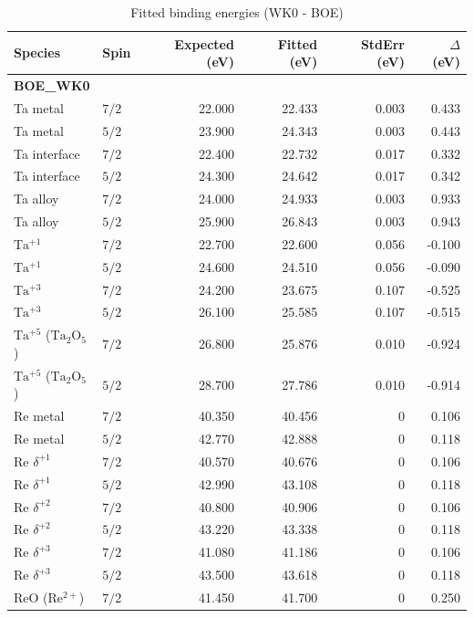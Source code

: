 \documentclass[12pt]{article}
\begin{document}
\begin{table}[H]
\centering
\begin{threeparttable}
\caption{Fitted binding energies (WK0 - BOE)}
\begin{tabular}{llrrrr}
\toprule
Species & Spin & Expected (eV) & Fitted (eV) & StdErr (eV) & $\Delta$ (eV) \\
\midrule
\multicolumn{6}{l}{\textbf{BOE\_WK0}} \\
Ta metal & $7/2$ & 22.000 & 22.433 & 0.003 & 0.433 \\
Ta metal & $5/2$ & 23.900 & 24.343 & 0.003 & 0.443 \\
Ta interface & $7/2$ & 22.400 & 22.732 & 0.017 & 0.332 \\
Ta interface & $5/2$ & 24.300 & 24.642 & 0.017 & 0.342 \\
Ta alloy & $7/2$ & 24.000 & 24.933 & 0.003 & 0.933 \\
Ta alloy & $5/2$ & 25.900 & 26.843 & 0.003 & 0.943 \\
$\mathrm{Ta^{+1}}$ & $7/2$ & 22.700 & 22.600 & 0.056 & -0.100 \\
$\mathrm{Ta^{+1}}$ & $5/2$ & 24.600 & 24.510 & 0.056 & -0.090 \\
$\mathrm{Ta^{+3}}$ & $7/2$ & 24.200 & 23.675 & 0.107 & -0.525 \\
$\mathrm{Ta^{+3}}$ & $5/2$ & 26.100 & 25.585 & 0.107 & -0.515 \\
$\mathrm{Ta^{+5}}$ ($\mathrm{Ta_2O_5}$) & $7/2$ & 26.800 & 25.876 & 0.010 & -0.924 \\
$\mathrm{Ta^{+5}}$ ($\mathrm{Ta_2O_5}$) & $5/2$ & 28.700 & 27.786 & 0.010 & -0.914 \\
Re metal & $7/2$ & 40.350 & 40.456 & 0 & 0.106 \\
Re metal & $5/2$ & 42.770 & 42.888 & 0 & 0.118 \\
$\mathrm{Re}$ $\delta^{+1}$ & $7/2$ & 40.570 & 40.676 & 0 & 0.106 \\
$\mathrm{Re}$ $\delta^{+1}$ & $5/2$ & 42.990 & 43.108 & 0 & 0.118 \\
$\mathrm{Re}$ $\delta^{+2}$ & $7/2$ & 40.800 & 40.906 & 0 & 0.106 \\
$\mathrm{Re}$ $\delta^{+2}$ & $5/2$ & 43.220 & 43.338 & 0 & 0.118 \\
$\mathrm{Re}$ $\delta^{+3}$ & $7/2$ & 41.080 & 41.186 & 0 & 0.106 \\
$\mathrm{Re}$ $\delta^{+3}$ & $5/2$ & 43.500 & 43.618 & 0 & 0.118 \\
$\mathrm{ReO}$ ($\mathrm{Re^{2+}}$) & $7/2$ & 41.450 & 41.700 & 0 & 0.250 \\

\end{tabular}
\end{threeparttable}
\end{table}
\end{document}
